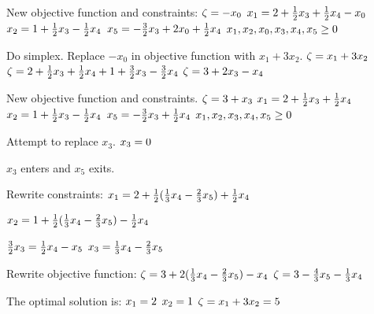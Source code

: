 \documentclass[17pt]{extarticle}
\begin{document}
\bigskip New objective function and constraints:
$\\ \zeta = - x_0$
$\\ x_1 = 2 + \frac{1}{2}x_3 + \frac{1}{2}x_4 - x_0$
$\\ x_2 = 1 + \frac{1}{2}x_3 - \frac{1}{2}x_4$
$\\ x_5 = - \frac{3}{2}x_3 + 2x_0 + \frac{1}{2}x_4$
$\\ x_1, x_2, x_0, x_3, x_4, x_5 \geq 0$

\bigskip Do simplex. Replace $-x_0$ in objective function with $x_1 + 3x_2$.
$\\ \zeta = x_1 + 3x_2$
$\\ \zeta = 2 + \frac{1}{2}x_3 + \frac{1}{2}x_4 + 1 + \frac{3}{2}x_3 - \frac{3}{2}x_4$
$\\ \zeta = 3 + 2x_3 - x_4$

\bigskip New objective function and constraints.
$\\ \zeta = 3 + x_3$
$\\ x_1 = 2 + \frac{1}{2}x_3 + \frac{1}{2}x_4$
$\\ x_2 = 1 + \frac{1}{2}x_3 - \frac{1}{2}x_4$
$\\ x_5 = - \frac{3}{2}x_3 + \frac{1}{2}x_4$
$\\ x_1, x_2, x_3, x_4, x_5 \geq 0$

\bigskip Attempt to replace $x_3$.
$\\ x_3 = 0$

\bigskip $x_3$ enters and $x_5$ exits.

\bigskip Rewrite constraints:
$\\ x_1 = 2 + \frac{1}{2}(\frac{1}{3}x_4 - \frac{2}{3}x_5) + \frac{1}{2}x_4$

$\\ x_2 = 1 + \frac{1}{2}(\frac{1}{3}x_4 - \frac{2}{3}x_5) - \frac{1}{2}x_4$

$\\ \frac{3}{2}x_3 = \frac{1}{2}x_4 - x_5$
$\\ x_3 = \frac{1}{3}x_4 - \frac{2}{3}x_5$

\bigskip Rewrite objective function:
$\\ \zeta = 3 + 2(\frac{1}{3}x_4 - \frac{2}{3}x_5) - x_4$
$\\ \zeta = 3 - \frac{4}{3}x_5 - \frac{1}{3}x_4$

\bigskip The optimal solution is:
$\\ x_1 = 2$
$\\ x_2 = 1$
$\\ \zeta = x_1 + 3x_2 = 5$
\end{document}
